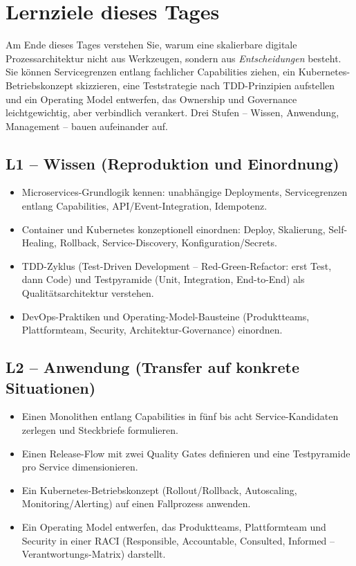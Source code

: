 \documentclass[11pt,a4paper,oneside]{article}
\begin{document}
\section*{Lernziele dieses Tages}
\thispagestyle{plain}

\noindent Am Ende dieses Tages verstehen Sie, warum eine skalierbare digitale Prozessarchitektur nicht aus Werkzeugen, sondern aus \emph{Entscheidungen} besteht. Sie können Servicegrenzen entlang fachlicher Capabilities ziehen, ein Kubernetes-Betriebskonzept skizzieren, eine Teststrategie nach TDD-Prinzipien aufstellen und ein Operating Model entwerfen, das Ownership und Governance leichtgewichtig, aber verbindlich verankert. Drei Stufen -- Wissen, Anwendung, Management -- bauen aufeinander auf.

\subsection*{L1 -- Wissen (Reproduktion und Einordnung)}
\begin{itemize}
  \item Microservices-Grundlogik kennen: unabhängige Deployments, Servicegrenzen entlang Capabilities, API/Event-Integration, Idempotenz.
  \item Container und Kubernetes konzeptionell einordnen: Deploy, Skalierung, Self-Healing, Rollback, Service-Discovery, Konfiguration/Secrets.
  \item TDD-Zyklus (Test-Driven Development -- Red-Green-Refactor: erst Test, dann Code) und Testpyramide (Unit, Integration, End-to-End) als Qualitätsarchitektur verstehen.
  \item DevOps-Praktiken und Operating-Model-Bausteine (Produktteams, Plattformteam, Security, Architektur-Governance) einordnen.
\end{itemize}

\subsection*{L2 -- Anwendung (Transfer auf konkrete Situationen)}
\begin{itemize}
  \item Einen Monolithen entlang Capabilities in fünf bis acht Service-Kandidaten zerlegen und Steckbriefe formulieren.
  \item Einen Release-Flow mit zwei Quality Gates definieren und eine Testpyramide pro Service dimensionieren.
  \item Ein Kubernetes-Betriebskonzept (Rollout/Rollback, Autoscaling, Monitoring/Alerting) auf einen Fallprozess anwenden.
  \item Ein Operating Model entwerfen, das Produktteams, Plattformteam und Security in einer RACI (Responsible, Accountable, Consulted, Informed -- Verantwortungs-Matrix) darstellt.
\end{itemize}
\end{document}
